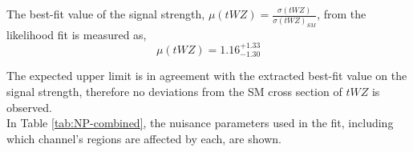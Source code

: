 The best-fit value of the signal strength, $\mu (tWZ)= \frac{\sigma(tWZ)}{\sigma(tWZ)_{SM}}$, from the likelihood fit is measured as,
\begin{equation}
  \mu (tWZ) =   1.16^{+1.33}_{-1.30}
\end{equation}

The expected upper limit is in agreement with the extracted best-fit value on the signal strength, therefore no deviations from the SM cross section of $tWZ$ is observed.\\

In Table \ref{tab:NP-combined}, the nuisance parameters used in the fit, including which channel's regions are affected by each, are shown.
\begin{table}[]
\footnotesize
{}
\end{table}
